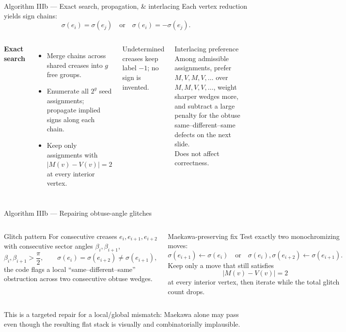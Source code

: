 \documentclass[aspectratio=169,10pt]{beamer}
\newcommand{\abs}[1]{\left\lvert #1\right\rvert}
\begin{document}
\begin{frame}{Algorithm IIIb — Exact search, propagation, \& interlacing}
Each vertex reduction yields sign chains:
\[
\sigma(e_i)=\sigma(e_j)\quad\text{or}\quad\sigma(e_i)=-\sigma(e_j).
\]
\begin{columns}[T,onlytextwidth]
\textbf{Exact search}
\begin{itemize}\small
  \item Merge chains across shared creases into \(g\) free groups.
  \item Enumerate all \(2^g\) seed assignments; propagate implied signs along each chain.
  \item Keep only assignments with \(\abs{M(v)-V(v)}=2\) at every interior vertex.
\end{itemize}
\textcolor{cpmid}{\small Undetermined creases keep label \(-1\); no sign is invented.}

\begin{block}{Interlacing preference}
\small Among admissible assignments, prefer
\(M,V,M,V,\ldots\) over \(M,M,V,V,\ldots\), weight sharper wedges more,
and subtract a large penalty for the obtuse same--different--same defects on
the next slide.\\[4pt]
\alert{Does not affect correctness.}
\end{block}
\end{columns}
\end{frame}

\begin{frame}{Algorithm IIIb — Repairing obtuse-angle glitches}
\begin{columns}[T,onlytextwidth]
\begin{block}{Glitch pattern}
\footnotesize For consecutive creases \(e_i,e_{i+1},e_{i+2}\) with consecutive
sector angles \(\beta_i,\beta_{i+1}\),
\[
\beta_i,\beta_{i+1}>\frac{\pi}{2},
\qquad
\sigma(e_i)=\sigma(e_{i+2})\neq \sigma(e_{i+1}),
\]
the code flags a local ``same--different--same'' obstruction across two
consecutive obtuse wedges.
\end{block}

\begin{alertblock}{Maekawa-preserving fix}
\footnotesize Test exactly two monochromizing moves:
\[
\sigma(e_{i+1})\leftarrow \sigma(e_i)
\quad\text{or}\quad
\sigma(e_i),\sigma(e_{i+2})\leftarrow \sigma(e_{i+1}).
\]
Keep only a move that still satisfies
\[
\abs{M(v)-V(v)}=2
\]
at every interior vertex, then iterate while the total glitch count drops.
\end{alertblock}
\end{columns}

\smallskip
\footnotesize This is a targeted repair for a local/global mismatch: Maekawa
alone may pass even though the resulting flat stack is visually and
combinatorially implausible.
\end{frame}
\end{document}
